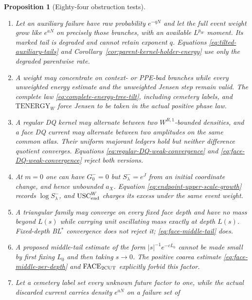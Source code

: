 \documentclass[11pt]{article}
\newtheorem{proposition}[theorem]{Proposition}
\begin{document}
\begin{proposition}[Eighty-four obstruction tests]
\begin{enumerate}[label=\textup{(T\arabic*)}]
      The tilted estimate \eqref{eq:upper-scale-excess-tail}, or its explicit
      parent-kernel $\mathrm{KRH}_{p_W}$ sufficient condition, rejects this
      correlated-mark model.
\item Let an auxiliary failure have raw probability $e^{-qN}$ and let the
      full event weight grow like $e^{aN}$ on precisely those branches, with
      an available $L^{p_W}$ moment.  Its marked tail is degraded and cannot
      retain exponent $q$.  Equations
      \eqref{eq:tilted-auxiliary-tails} and
      Corollary~\ref{cor:parent-kernel-holder-energy} use only the degraded
      parentwise rate.
\item A weight may concentrate on context- or PPE-bad branches while every
      unweighted energy estimate and the unweighted Jensen step remain
      valid.  The complete law \eqref{eq:complete-energy-tree-tilt}, including
      cemetery labels, and $\mathrm{TENERGY}_{W}$ force Jensen to be taken in
      the actual positive phase law.
\item A regular DQ kernel may alternate between two
      $W^{R,1}$-bounded densities, and a face DQ current may alternate between
      two amplitudes on the same common atlas.  Their uniform majorant ledgers
      hold but neither difference quotient converges.  Equations
      \eqref{eq:regular-DQ-weak-convergence} and
      \eqref{eq:face-DQ-weak-convergence} reject both versions.
\item At $m=0$ one can have $G_0^-=0$ but
      $S_\lambda^-=e^J$ from an initial coordinate change, and hence
      unbounded $a_X$.  Equation \eqref{eq:endpoint-upper-scale-growth} records
      $\log S_\lambda^-$, and $\mathrm{USC}_{\rm end}^{W}$ charges its excess
      under the same event weight.
\item A triangular family may converge on every fixed face depth and have
      no mass beyond $L(s)$ while carrying unit oscillating mass exactly at
      depth $L(s)$.  Fixed-depth BL$^*$ convergence does not reject it;
      \eqref{eq:face-middle-tail} does.
\item A proposed middle-tail estimate of the form
      $|s|^{-1}e^{-cL_0}$ cannot be made small by first fixing $L_0$ and then
      taking $s\to0$.  The positive coarea estimate
      \eqref{eq:face-middle-per-depth} and
      $\mathrm{FACE}_{\rm 2CUT}$ explicitly forbid this factor.
\item Let a cemetery label set every unknown future factor to one, while the
      actual discarded current carries density $e^{aN}$ on a failure set of

\end{enumerate}
\end{proposition}
\end{document}
